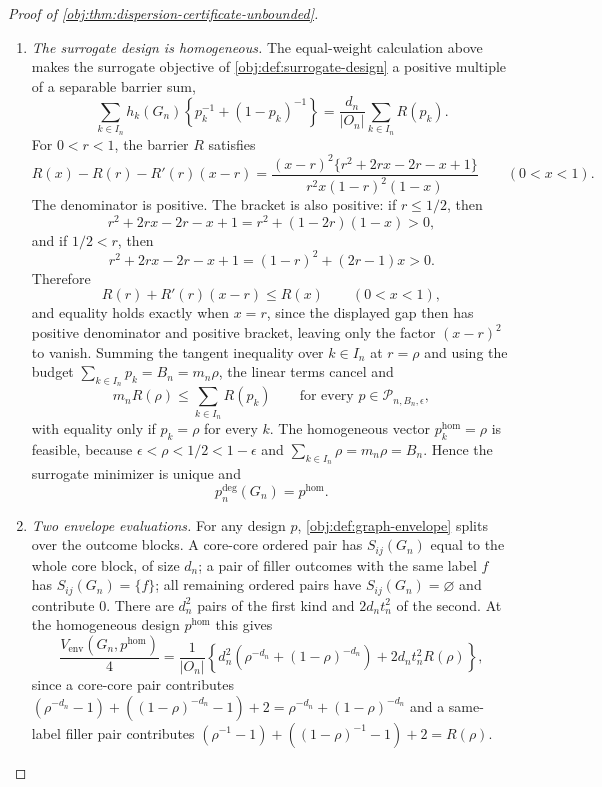 \documentclass[11pt]{article}
\begin{document}
\begin{proof}[Proof of \cref{obj:thm:dispersion-certificate-unbounded}]
\begin{enumerate}
\item \textit{The surrogate design is homogeneous.}  The equal-weight calculation above makes the surrogate objective of \cref{obj:def:surrogate-design} a positive multiple of a separable barrier sum,
\[
\sum_{k\in I_n}h_k(G_n)\left\{p_k^{-1}+(1-p_k)^{-1}\right\}
=\frac{d_n}{|O_n|}\sum_{k\in I_n}R(p_k).
\]
For \(0<r<1\), the barrier \(R\) satisfies
\[
R(x)-R(r)-R'(r)(x-r)
=
\frac{(x-r)^2\{r^2+2rx-2r-x+1\}}
{r^2x(1-r)^2(1-x)}
\qquad(0<x<1).
\]
The denominator is positive.  The bracket is also positive: if \(r\leq1/2\), then
\[
r^2+2rx-2r-x+1=r^2+(1-2r)(1-x)>0,
\]
and if \(1/2<r\), then
\[
r^2+2rx-2r-x+1=(1-r)^2+(2r-1)x>0.
\]
Therefore
\[
R(r)+R'(r)(x-r)\leq R(x)
\qquad(0<x<1),
\]
and equality holds exactly when \(x=r\), since the displayed gap then has positive denominator and positive bracket, leaving only the factor \((x-r)^2\) to vanish.
Summing the tangent inequality over \(k\in I_n\) at \(r=\rho\) and using the budget \(\sum_{k\in I_n}p_k=B_n=m_n\rho\), the linear terms cancel and
\[
m_nR(\rho)\leq\sum_{k\in I_n}R(p_k)
\qquad\text{for every }p\in\mathcal P_{n,B_n,\epsilon},
\]
with equality only if \(p_k=\rho\) for every \(k\).  The homogeneous vector \(p^{\mathrm{hom}}_k=\rho\) is feasible, because \(\epsilon<\rho<1/2<1-\epsilon\) and \(\sum_{k\in I_n}\rho=m_n\rho=B_n\).  Hence the surrogate minimizer is unique and
\[
p_n^{\deg}(G_n)=p^{\mathrm{hom}} .
\]

\item \textit{Two envelope evaluations.}  For any design \(p\), \cref{obj:def:graph-envelope} splits over the outcome blocks.  A core-core ordered pair has \(S_{ij}(G_n)\) equal to the whole core block, of size \(d_n\); a pair of filler outcomes with the same label \(f\) has \(S_{ij}(G_n)=\{f\}\); all remaining ordered pairs have \(S_{ij}(G_n)=\varnothing\) and contribute \(0\).  There are \(d_n^2\) pairs of the first kind and \(2d_nt_n^2\) of the second.  At the homogeneous design \(p^{\mathrm{hom}}\) this gives
\[
\frac{V_{\mathrm{env}}(G_n,p^{\mathrm{hom}})}{4}
=\frac{1}{|O_n|}
\left\{
d_n^2\left(\rho^{-d_n}+(1-\rho)^{-d_n}\right)
+2d_nt_n^2R(\rho)
\right\},
\]
since a core-core pair contributes \((\rho^{-d_n}-1)+((1-\rho)^{-d_n}-1)+2=\rho^{-d_n}+(1-\rho)^{-d_n}\) and a same-label filler pair contributes \((\rho^{-1}-1)+((1-\rho)^{-1}-1)+2=R(\rho)\).


\end{enumerate}
\end{proof}
\end{document}
